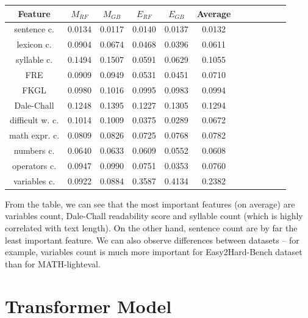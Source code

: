 \documentclass[runningheads]{llncs}
\begin{document}
\vspace{5pt}

\begin{minipage}{\linewidth}
    \centering
    \label{tab:importances}
    \begin{tabular}{@{}|Sc|Sc|Sc|Sc|Sc|Sc|@{}}
        \hline
        \textbf{Feature} & \textbf{$M_{RF}$} & \textbf{$M_{GB}$} & \textbf{$E_{RF}$} & \textbf{$E_{GB}$} & \textbf{Average} \\
        \hline
        sentence c. & 0.0134 & 0.0117 & 0.0140 & 0.0137 & 0.0132 \\
        lexicon c. & 0.0904 & 0.0674 & 0.0468 & 0.0396 & 0.0611 \\
        syllable c. & 0.1494 & 0.1507 & 0.0591 & 0.0629 & 0.1055 \\
        FRE & 0.0909 & 0.0949 & 0.0531 & 0.0451 & 0.0710 \\
        FKGL & 0.0980 & 0.1016 & 0.0995 & 0.0983 & 0.0994 \\
        Dale-Chall & 0.1248 & 0.1395 & 0.1227 & 0.1305 & 0.1294 \\
        difficult w. c. & 0.1014 & 0.1009 & 0.0375 & 0.0289 & 0.0672 \\
        math expr. c. & 0.0809 & 0.0826 & 0.0725 & 0.0768 & 0.0782 \\
        numbers c. & 0.0640 & 0.0633 & 0.0609 & 0.0552 & 0.0608 \\
        operators c. & 0.0947 & 0.0990 & 0.0751 & 0.0353 & 0.0760 \\
        variables c. & 0.0922 & 0.0884 & 0.3587 & 0.4134 & 0.2382 \\
        \hline
    \end{tabular}
\end{minipage}

\vspace{5pt}

From the table, we can see that the most important features (on average) are variables count, Dale-Chall readability score and syllable count (which is highly correlated with text length). On the other hand, sentence count are by far the least important feature. We can also observe differences between datasets -- for example, variables count is much more important for Easy2Hard-Bench dataset than for MATH-lighteval.


\section{Transformer Model}
\label{sec:bert}
\end{document}
